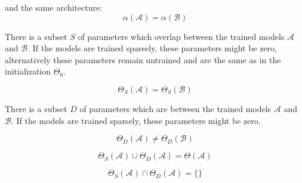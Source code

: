 and the same architecture:
\begin{equation}
    \alpha(\mathcal{A}) = \alpha(\mathcal{B}) 
\end{equation}

There is a subset $S$ of parameters which overlap between the trained models $\mathcal{A}$ and $\mathcal{B}$. If the models are trained sparsely, these parameters might be zero, alternatively these parameters remain untrained and are the same as in the initialization $\Theta_0$.

\begin{equation}
    \Theta_S(\mathcal{A}) =  \Theta_S(\mathcal{B}) 
\end{equation}

There is a subset $D$ of parameters which are  between the trained models $\mathcal{A}$ and $\mathcal{B}$. If the models are trained sparsely, these parameters might be zero.

\begin{equation}
    \Theta_D(\mathcal{A}) \neq  \Theta_D(\mathcal{B}) 
\end{equation}

\begin{equation}
    \Theta_S(\mathcal{A}) \cup \Theta_D(\mathcal{A}) =  \Theta(\mathcal{A}) 
\end{equation}


\begin{equation}
    \Theta_S(\mathcal{A}) \cap \Theta_D(\mathcal{A}) =  \{\}
\end{equation}



